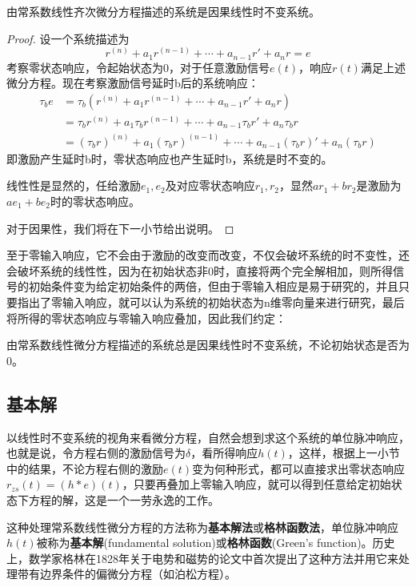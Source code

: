 \begin{proposition}
    由常系数线性齐次微分方程描述的系统是因果线性时不变系统。
\end{proposition}
\begin{proof}
    设一个系统描述为
\[r^{(n)}+a_{1}r^{(n-1)}+\cdots +a_{n-1} r'+a_n r=e\]
考察零状态响应，令起始状态为0，对于任意激励信号$e(t)$，响应$r(t)$满足上述微分方程。现在考察激励信号延时b后的系统响应：
\begin{align*}
    \tau_b e&=\tau_b(r^{(n)}+a_{1}r^{(n-1)}+\cdots +a_{n-1} r'+a_n r)\\
    &=\tau_b r^{(n)}+a_{1}\tau_b r^{(n-1)}+\cdots +a_{n-1} \tau_b r'+a_n \tau_b r\\
    &= (\tau_b r)^{(n)}+a_{1}(\tau_b r)^{(n-1)}+\cdots +a_{n-1} (\tau_b r)'+a_n (\tau_b r)
\end{align*}
即激励产生延时b时，零状态响应也产生延时b，系统是时不变的。

线性性是显然的，任给激励$e_1,e_2$及对应零状态响应$r_1,r_2$，显然$ar_1+br_2$是激励为$ae_1+be_2$时的零状态响应。

对于因果性，我们将在下一小节给出说明。
\end{proof}
至于零输入响应，它不会由于激励的改变而改变，不仅会破坏系统的时不变性，还会破坏系统的线性性，因为在初始状态非0时，直接将两个完全解相加，则所得信号的初始条件变为给定初始条件的两倍，但由于零输入相应是易于研究的，并且只要指出了零输入响应，就可以认为系统的初始状态为n维零向量来进行研究，最后将所得的零状态响应与零输入响应叠加，因此我们约定：
\begin{definition}
    由常系数线性微分方程描述的系统总是因果线性时不变系统，不论初始状态是否为0。
\end{definition}

\subsection{基本解}\label{sub:fundamental_solution}

以线性时不变系统的视角来看微分方程，自然会想到求这个系统的单位脉冲响应，也就是说，令方程右侧的激励信号为$\delta$，看所得响应$h(t)$，这样，根据上一小节中的结果，不论方程右侧的激励$e(t)$变为何种形式，都可以直接求出零状态响应$r_{zs}(t)=(h*e)(t)$，只要再叠加上零输入响应，就可以得到任意给定初始状态下方程的解，这是一个一劳永逸的工作。

这种处理常系数线性微分方程的方法称为\textbf{基本解法}或\textbf{格林函数法}，单位脉冲响应$h(t)$被称为\textbf{基本解}(fundamental solution)或\textbf{格林函数}(Green's function)。历史上，数学家格林在1828年关于电势和磁势的论文中首次提出了这种方法并用它来处理带有边界条件的偏微分方程（如泊松方程）。

